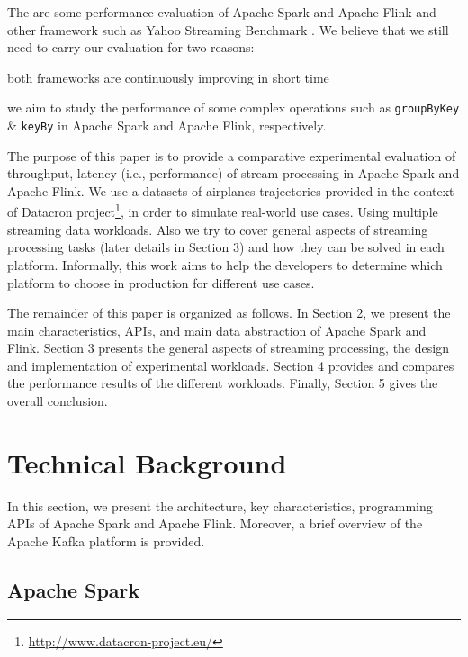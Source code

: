 \documentclass[]{article}
\begin{document}
\par The are some performance evaluation of Apache Spark and Apache Flink and other framework such as Yahoo Streaming Benchmark \cite{yahoo}. We believe that we still need to carry our evaluation for two reasons: \begin{enumerate*}[label=(\roman*)]
\item both frameworks are continuously improving in short time 
\item we aim to study the performance of some complex operations such as \texttt{groupByKey} \& \texttt{keyBy} in Apache Spark and Apache Flink, respectively.
\end{enumerate*}

 

\par The purpose of this paper is to provide a comparative experimental evaluation of throughput, latency (i.e., performance) of stream processing in Apache Spark and Apache Flink. We use a datasets of airplanes trajectories provided in the context of Datacron project\footnote{\url{http://www.datacron-project.eu/}}, in order to simulate real-world use cases. Using multiple streaming data workloads. Also we try to cover general aspects of streaming processing tasks (later details in Section 3) and how they can be solved in each platform. Informally,  this work aims to help the developers to determine which platform to choose in production for different use cases. 


\par The remainder of this paper is organized as follows.
In Section 2, we present the main characteristics, APIs, and main data abstraction of Apache Spark and Flink. Section 3  presents the general aspects of streaming processing, the design and implementation of experimental workloads. Section 4
provides and compares the performance results of the different workloads. Finally, Section 5 gives the overall conclusion.

\section{Technical Background}
 In this section, we present the architecture, key characteristics, programming APIs  of Apache Spark and Apache Flink. Moreover, a brief overview of the Apache Kafka platform is  provided.

\subsection{Apache Spark}
\end{document}
